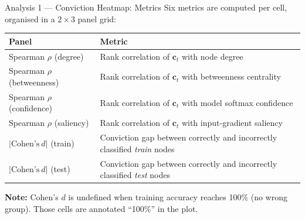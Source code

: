 \documentclass[11pt]{beamer}
\begin{document}
\begin{frame}{Analysis 1 --- Conviction Heatmap: Metrics}
Six metrics are computed per cell, organised in a $2\times 3$ panel grid:
\bigskip
\begin{center}
\renewcommand{\arraystretch}{1.4}
\begin{tabular}{lp{6.8cm}}
\toprule
\textbf{Panel} & \textbf{Metric} \\
\midrule
Spearman $\rho$ (degree)      & Rank correlation of $\mathbf{c}_t$ with node degree \\
Spearman $\rho$ (betweenness) & Rank correlation of $\mathbf{c}_t$ with betweenness centrality \\
Spearman $\rho$ (confidence)  & Rank correlation of $\mathbf{c}_t$ with model softmax confidence \\
Spearman $\rho$ (saliency)    & Rank correlation of $\mathbf{c}_t$ with input-gradient saliency \\
$|\text{Cohen's}\ d|$ (train) & Conviction gap between correctly and incorrectly classified \emph{train} nodes \\
$|\text{Cohen's}\ d|$ (test)  & Conviction gap between correctly and incorrectly classified \emph{test} nodes \\
\bottomrule
\end{tabular}
\end{center}
\medskip
\small \textbf{Note:} Cohen's $d$ is undefined when training accuracy reaches 100\% (no wrong group). Those cells are annotated ``100\%'' in the plot.
\end{frame}
\end{document}
